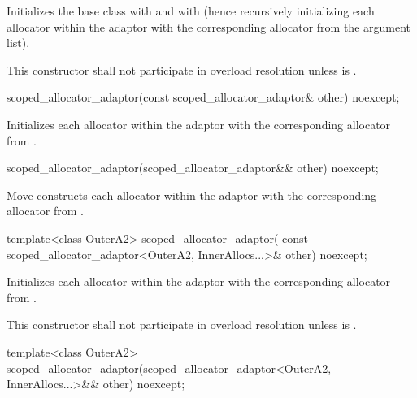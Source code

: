 \begin{itemdescr}
\pnum
\effects Initializes the  base class with
 and  with 
(hence recursively initializing each allocator within the adaptor with the corresponding
allocator from the argument list).

\pnum
\remarks This constructor shall not participate in overload resolution unless
 is .
\end{itemdescr}

%
\begin{itemdecl}
scoped_allocator_adaptor(const scoped_allocator_adaptor& other) noexcept;
\end{itemdecl}

\begin{itemdescr}
\pnum
\effects Initializes each allocator within the adaptor with the corresponding allocator
from .
\end{itemdescr}

%
\begin{itemdecl}
scoped_allocator_adaptor(scoped_allocator_adaptor&& other) noexcept;
\end{itemdecl}

\begin{itemdescr}
\pnum
\effects Move constructs each allocator within the adaptor with the corresponding allocator
from .
\end{itemdescr}

%
\begin{itemdecl}
template<class OuterA2>
  scoped_allocator_adaptor(
    const scoped_allocator_adaptor<OuterA2, InnerAllocs...>& other) noexcept;
\end{itemdecl}

\begin{itemdescr}
\pnum
\effects Initializes each allocator within the adaptor with the corresponding allocator
from .

\pnum
\remarks This constructor shall not participate in overload resolution unless
 is .
\end{itemdescr}

%
\begin{itemdecl}
template<class OuterA2>
  scoped_allocator_adaptor(scoped_allocator_adaptor<OuterA2, InnerAllocs...>&& other) noexcept;
\end{itemdecl}

